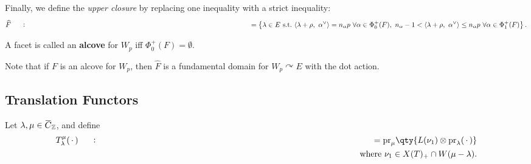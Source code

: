 \begin{definition}

\begin{definition}

Finally, we define the \emph{upper closure} by replacing one inequality
with a strict inequality:
\begin{align*}   \widehat{F} \mathrel{\vcenter{:}}=\left\{{ \lambda \in E ~{\text{s.t.}}~{\left\langle {\lambda + \rho},~{\alpha^\vee} \right\rangle} = n_\alpha p\,\, \forall\alpha\in \Phi_0^+(F),\,\, n_\alpha - 1 < {\left\langle {\lambda + \rho},~{\alpha^\vee} \right\rangle} \leq n_\alpha p \,\,\forall \alpha\in \Phi_1^+(F) }\right\} .\end{align*}

\end{definition}

\end{definition}

\begin{definition}[Alcove]

\begin{definition}[Alcove]

A facet is called an \textbf{alcove} for \(W_p\) iff
\(\Phi_0^+(F) = \emptyset\).

\end{definition}

\end{definition}

\begin{remark}

\begin{remark}

Note that if \(F\) is an alcove for \(W_p\), then \(\widehat{F}\) is a
fundamental domain for \(W_p\curvearrowright E\) with the dot action.

\end{remark}

\end{remark}

\hypertarget{translation-functors-1}{%
\subsection{Translation Functors}\label{translation-functors-1}}

Let
\(\lambda, \mu\in \mkern 1.5mu\overline{\mkern-1.5muC\mkern-1.5mu}\mkern 1.5mu_{\mathbb{Z}}\),
and define
\begin{align*}   T_\lambda^\mu({\,\cdot\,}) \mathrel{\vcenter{:}}= {\operatorname{pr}}_\mu \qty{ L(\nu_1) \otimes{\operatorname{pr}}_\lambda({\,\cdot\,}) }\\ \text{where }  \nu_1 \in X(T)_+ \cap W(\mu-\lambda) .\end{align*}

